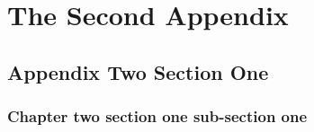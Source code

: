 \appendix
\renewcommand\thefigure{\thechapter.\arabic{figure}}
\renewcommand\thetable{\thechapter.\arabic{table}}





\setcounter{figure}{0}
\setcounter{table}{0}
\chapter{The Second Appendix}
\section{Appendix Two Section One}
\subsection{Chapter two section one sub-section one}

